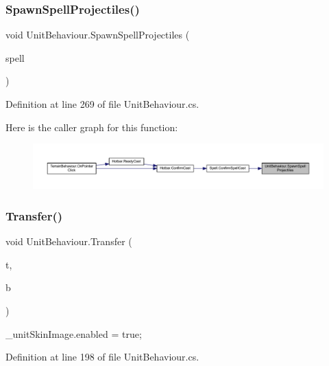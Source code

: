 \subsubsection{\texorpdfstring{SpawnSpellProjectiles()}{SpawnSpellProjectiles()}}
{\footnotesize\ttfamily void Unit\+Behaviour.\+Spawn\+Spell\+Projectiles (\begin{DoxyParamCaption}\item[{\mbox{\hyperlink{class_spell}{Spell}}}]{spell }\end{DoxyParamCaption})}



Definition at line 269 of file Unit\+Behaviour.\+cs.

Here is the caller graph for this function\+:
\nopagebreak
\begin{figure}[H]
\begin{center}
\leavevmode
\includegraphics[width=350pt]{class_unit_behaviour_a2eee29cede96c8d2aa45e89eda7c0c3c_icgraph}
\end{center}
\end{figure}
\mbox{\label{class_unit_behaviour_a7e978454f207985987f6088c037b9c5f}} 
\subsubsection{\texorpdfstring{Transfer()}{Transfer()}}
{\footnotesize\ttfamily void Unit\+Behaviour.\+Transfer (\begin{DoxyParamCaption}\item[{\mbox{\hyperlink{class_tile}{Tile}}}]{t,  }\item[{\mbox{\hyperlink{class_base_unit}{Base\+Unit}}}]{b }\end{DoxyParamCaption})}

\+\_\+unit\+Skin\+Image.\+enabled = true; 

Definition at line 198 of file Unit\+Behaviour.\+cs.

